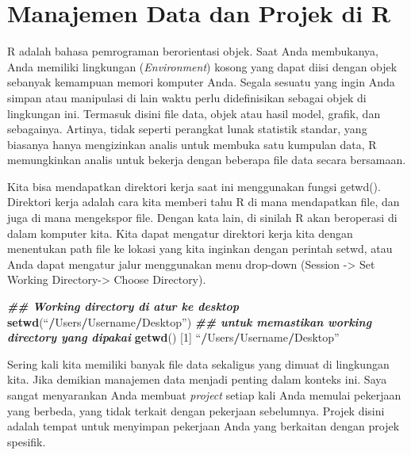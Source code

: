 \documentclass[a4paper, nobind]{templates/ociamthesis}
\newenvironment{Shaded}{\begin{snugshade}}{\end{snugshade}}
\newcommand{\DecValTok}[1]{\textcolor[rgb]{0.00,0.00,0.81}{#1}}
\newcommand{\DocumentationTok}[1]{\textcolor[rgb]{0.56,0.35,0.01}{\textbf{\textit{#1}}}}
\newcommand{\FunctionTok}[1]{\textcolor[rgb]{0.13,0.29,0.53}{\textbf{#1}}}
\newcommand{\NormalTok}[1]{#1}
\newcommand{\SpecialCharTok}[1]{\textcolor[rgb]{0.81,0.36,0.00}{\textbf{#1}}}
\renewenvironment{Shaded}
{
  \vspace{10pt}%
  \begin{snugshade}%
}{%
  \end{snugshade}%
  \vspace{8pt}%
}
\begin{document}
\hypertarget{manajemen-data-dan-projek-di-r}{%
\section{Manajemen Data dan Projek di R}\label{manajemen-data-dan-projek-di-r}}

R adalah bahasa pemrograman berorientasi objek. Saat Anda membukanya, Anda memiliki lingkungan (\emph{Environment}) kosong yang dapat diisi dengan objek sebanyak kemampuan memori komputer Anda. Segala sesuatu yang ingin Anda simpan atau manipulasi di lain waktu perlu didefinisikan sebagai objek di lingkungan ini. Termasuk disini file data, objek atau hasil model, grafik, dan sebagainya. Artinya, tidak seperti perangkat lunak statistik standar, yang biasanya hanya mengizinkan analis untuk membuka satu kumpulan data, R memungkinkan analis untuk bekerja dengan beberapa file data secara bersamaan.

Kita bisa mendapatkan direktori kerja saat ini menggunakan fungsi getwd(). Direktori kerja adalah cara kita memberi tahu R di mana mendapatkan file, dan juga di mana mengekspor file. Dengan kata lain, di sinilah R akan beroperasi di dalam komputer kita. Kita dapat mengatur direktori kerja kita dengan menentukan path file ke lokasi yang kita inginkan dengan perintah setwd, atau Anda dapat mengatur jalur menggunakan menu drop-down (Session -\textgreater{} Set Working Directory-\textgreater{} Choose Directory).

\begin{Shaded}
\begin{Highlighting}[]
\DocumentationTok{\#\# Working directory di atur ke desktop}
\FunctionTok{setwd}\NormalTok{(“}\SpecialCharTok{/}\NormalTok{Users}\SpecialCharTok{/}\NormalTok{Username}\SpecialCharTok{/}\NormalTok{Desktop”) }
\DocumentationTok{\#\# untuk memastikan working directory yang dipakai}
\FunctionTok{getwd}\NormalTok{() }
\NormalTok{[}\DecValTok{1}\NormalTok{] “}\SpecialCharTok{/}\NormalTok{Users}\SpecialCharTok{/}\NormalTok{Username}\SpecialCharTok{/}\NormalTok{Desktop” }
\end{Highlighting}
\end{Shaded}

Sering kali kita memiliki banyak file data sekaligus yang dimuat di lingkungan kita. Jika demikian manajemen data menjadi penting dalam konteks ini. Saya sangat menyarankan Anda membuat \emph{project} setiap kali Anda memulai pekerjaan yang berbeda, yang tidak terkait dengan pekerjaan sebelumnya. Projek disini adalah tempat untuk menyimpan pekerjaan Anda yang berkaitan dengan projek spesifik.
\end{document}
